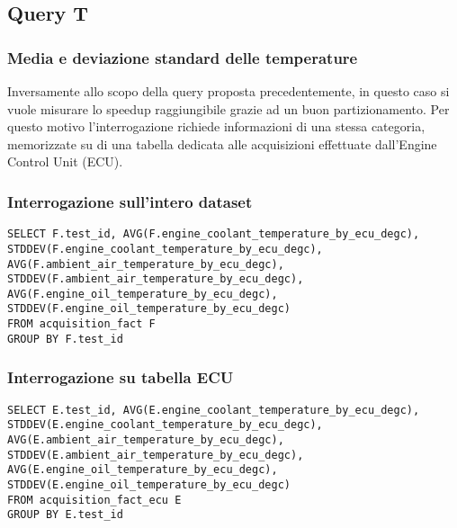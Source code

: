 \subsection{Query T}
\subsubsection{Media e deviazione standard delle temperature}
Inversamente allo scopo della query proposta precedentemente, in questo caso si vuole misurare lo speedup raggiungibile grazie ad un buon partizionamento. Per questo motivo l'interrogazione richiede informazioni di una stessa categoria, memorizzate su di una tabella dedicata alle acquisizioni effettuate dall'Engine Control Unit (ECU).
\subsubsection{Interrogazione sull'intero dataset}
\begin{lstlisting}[language=mySQL]
SELECT F.test_id, AVG(F.engine_coolant_temperature_by_ecu_degc), STDDEV(F.engine_coolant_temperature_by_ecu_degc), AVG(F.ambient_air_temperature_by_ecu_degc), STDDEV(F.ambient_air_temperature_by_ecu_degc), AVG(F.engine_oil_temperature_by_ecu_degc), STDDEV(F.engine_oil_temperature_by_ecu_degc)
FROM acquisition_fact F
GROUP BY F.test_id
\end{lstlisting}
\subsubsection{Interrogazione su tabella ECU}
\begin{lstlisting}[language=mySQL]
SELECT E.test_id, AVG(E.engine_coolant_temperature_by_ecu_degc), STDDEV(E.engine_coolant_temperature_by_ecu_degc), AVG(E.ambient_air_temperature_by_ecu_degc), STDDEV(E.ambient_air_temperature_by_ecu_degc), AVG(E.engine_oil_temperature_by_ecu_degc), STDDEV(E.engine_oil_temperature_by_ecu_degc)
FROM acquisition_fact_ecu E
GROUP BY E.test_id
\end{lstlisting}


